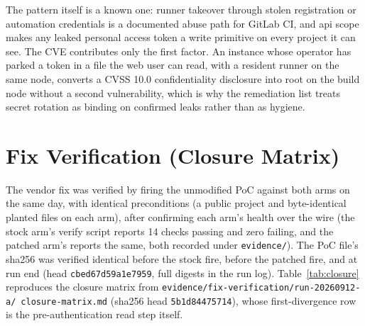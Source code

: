 \documentclass[journal]{IEEEtran}
\begin{document}
The pattern itself is a known one: runner takeover through stolen registration
or automation credentials is a documented abuse path for GitLab CI, and api
scope makes any leaked personal access token a write primitive on every
project it can see. The CVE contributes only the first factor. An instance
whose operator has parked a token in a file the web user can read, with a
resident runner on the same node, converts a CVSS 10.0 confidentiality
disclosure into root on the build node without a second vulnerability, which
is why the remediation list treats secret rotation as binding on confirmed
leaks rather than as hygiene.

\section{Fix Verification (Closure Matrix)}
\label{sec:fix}

The vendor fix was verified by firing the unmodified PoC against both arms on
the same day, with identical preconditions (a public project and byte-identical
planted files on each arm), after confirming each arm's health over the wire
(the stock arm's verify script reports 14 checks passing and zero failing, and
the patched arm's reports the same, both recorded under
\texttt{evidence/}). The PoC file's sha256 was verified identical before the
stock fire, before the patched fire, and at run end (head
\texttt{cbed67d59a1e7959},
full digests in the run log). Table~\ref{tab:closure} reproduces the closure
matrix \cite{closure} from \texttt{evidence/}\hspace{0pt}\texttt{fix-verification/}\hspace{0pt}\texttt{run-20260912-a/}\
\texttt{closure-matrix.md}
(sha256 head \texttt{5b1d84475714}),
whose first-divergence row is the pre-authentication read step itself.
\end{document}
